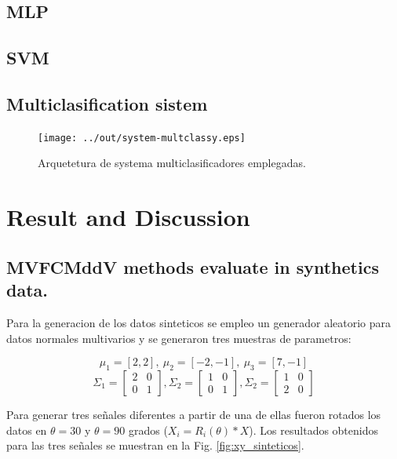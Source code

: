 \documentclass[12pt]{article}
\begin{document}
\subsection{MLP}

\subsection{SVM}

\subsection{Multiclasification sistem}


\begin{figure}[h]
\centering
\texttt{[image: ../out/system-multclassy.eps]}
\caption{Arquetetura de systema multiclasificadores emplegadas.}
\label{fig:mult_system_classy}
\end{figure}  



\section{Result and Discussion }


\subsection{MVFCMddV methods evaluate in synthetics data.}

Para la generacion de los datos sinteticos se empleo un generador aleatorio para datos normales multivarios y se generaron tres muestras de parametros: 

$$\mu_1 = [2, 2], \ \mu_2 = [-2, -1], \ \mu_3 = [7, -1] $$
$$\Sigma_1 = \left[ \begin{matrix}
2 & 0 \\ 
0 & 1
\end{matrix} \right], 
\Sigma_2 = \left[ \begin{matrix}
1 & 0 \\ 
0 & 1
\end{matrix} \right], 
\Sigma_2 = \left[ \begin{matrix}
1 & 0 \\ 
2 & 0
\end{matrix} \right] $$

Para generar tres señales diferentes a partir de una de ellas fueron rotados los datos en $\theta = 30$ y $\theta = 90$ grados ($X_i = R_i(\theta)*X$). Los resultados obtenidos para las tres señales se muestran en la Fig. \ref{fig:xy_sinteticos}.
\end{document}
